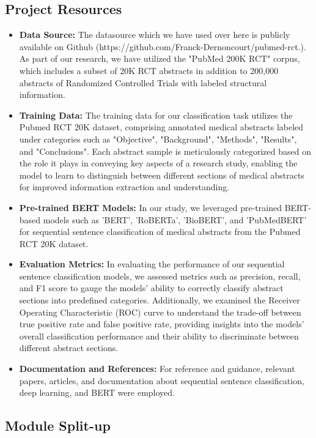 \documentclass[12pt,a4paper]{report}     %
\begin{document}
\begin{normalsize}
{\subsection{Project Resources}
\begin{itemize}
    \item \textbf{Data Source:} The datasource which we have used over here is publicly available on Github (https://github.com/Franck-Dernoncourt/pubmed-rct.). As part of our research, we have utilized the "PubMed 200K RCT" corpus, which includes a subset of 20K RCT abstracts in addition to 200,000 abstracts of Randomized Controlled Trials with labeled structural information. 

\item \textbf{Training Data:} The training data for our classification task utilizes the Pubmed RCT 20K dataset, comprising annotated medical abstracts labeled under categories such as "Objective", "Background", "Methods", "Results", and "Conclusions". Each abstract sample is meticulously categorized based on the role it plays in conveying key aspects of a research study, enabling the model to learn to distinguish between different sections of medical abstracts for improved information extraction and understanding.
\item \textbf{Pre-trained BERT Models:} In our study, we leveraged pre-trained BERT-based models such as 'BERT', 'RoBERTa', 'BioBERT', and 'PubMedBERT' for sequential sentence classification of medical abstracts from the Pubmed RCT 20K dataset.

\item \textbf{Evaluation Metrics:} In evaluating the performance of our sequential sentence classification models, we assessed metrics such as precision, recall, and F1 score to gauge the models' ability to correctly classify abstract sections into predefined categories. Additionally, we examined the Receiver Operating Characteristic (ROC) curve to understand the trade-off between true positive rate and false positive rate, providing insights into the models' overall classification performance and their ability to discriminate between different abstract sections.
\item \textbf{Documentation and References:} For reference and guidance, relevant papers, articles, and documentation about sequential sentence classification, deep learning, and BERT were employed.
\end{itemize}
\subsection{Module Split-up}

}
\end{normalsize}
\end{document}
